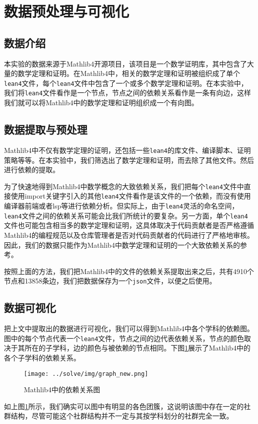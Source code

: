 \section{数据预处理与可视化}

\subsection{数据介绍}

本实验的数据来源于Mathlib4开源项目\cite{mathlib4}，该项目是一个数学证明库，其中包含了大量的数学定理和证明。在Mathlib4中，相关的数学定理和证明被组织成了单个\texttt{lean4}文件，每个\texttt{lean4}文件中包含了一个或多个数学定理和证明。在本实验中，我们将\texttt{lean4}文件看作是一个节点，节点之间的依赖关系看作是一条有向边，这样我们就可以将Mathlib4中的数学定理和证明组织成一个有向图。

\subsection{数据提取与预处理}

Mathlib4中不仅有数学定理的证明，还包括一些\texttt{lean4}的库文件、编译脚本、证明策略等等。在本实验中，我们筛选出了数学定理和证明，而去除了其他文件。然后进行依赖的提取。

为了快速地得到Mathlib4中数学概念的大致依赖关系，我们把每个\texttt{\texttt{lean4}}文件中直接使用import关键字引入的其他\texttt{lean4}文件看作是该文件的一个依赖，而没有使用编译器前端或者lsp等进行依赖分析。但实际上，由于\texttt{lean4}灵活的命名空间，\texttt{lean4}文件之间的依赖关系可能会比我们所统计的要复杂。另一方面，单个\texttt{lean4}文件也可能包含相当多的数学定理和证明，这具体取决于代码贡献者是否严格遵循Mathlib4的编程规范以及仓库管理者是否对代码贡献者的代码进行了严格地审核。因此，我们的数据只能作为Mathlib4中数学定理和证明的一个大致依赖关系的参考。

按照上面的方法，我们把Mathlib4中的文件的依赖关系提取出来之后，共有4910个节点和13858条边，我们把数据保存为一个\texttt{json}文件，以便之后使用。

\subsection{数据可视化}

把上文中提取出的数据进行可视化，我们可以得到Mathlib4中各个学科的依赖图。图中的每个节点代表一个\texttt{lean4}文件，节点之间的边代表依赖关系，节点的颜色取决于其所在的子学科，边的颜色与被依赖的节点相同。下图\ref{fig:dependency}展示了Mathlib4中的各个子学科的依赖关系。

\begin{figure}[htb]
    \centering
    \texttt{[image: ../solve/img/graph\_new.png]}
    \caption{Mathlib4中的依赖关系图}
    \label{fig:dependency}
\end{figure}

如上图\ref{fig:dependency}所示，我们确实可以图中有明显的各色团簇，这说明该图中存在一定的社群结构，尽管可能这个社群结构并不一定与其按学科划分的社群完全一致。
